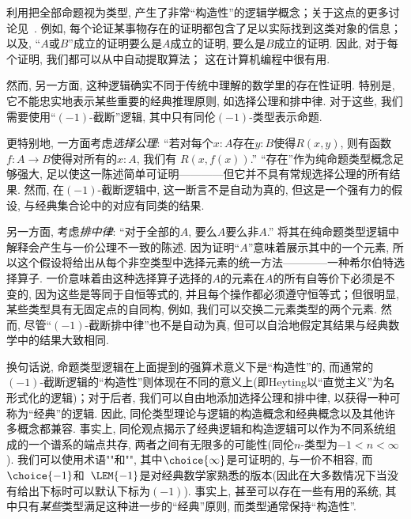 利用把全部命题视为类型, 产生了非常``构造性''的逻辑学概念；关于这点的更多讨论见~\cite{kolmogorov,TroelstraI,TroelstraII}.
例如, 每个论证某事物存在的证明都包含了足以实际找到这类对象的信息；以及, ``$A$或$B$''成立的证明要么是$A$成立的证明, 要么是$B$成立的证明. 
因此, 对于每个证明, 我们都可以从中自动提取算法； 这在计算机编程中很有用. 

然而, 另一方面, 这种逻辑确实不同于传统中理解的数学里的存在性证明. 
特别是, 它不能忠实地表示某些重要的经典推理原则, 如选择公理和排中律. 
对于这些, 我们需要使用``$(-1)$-截断''逻辑, 其中只有同伦$(-1)$-类型表示命题. 

%
更特别地, 一方面考虑\emph{选择公理}: ``若对每个$x: A$存在$y: B$使得$R(x,y)$, 则有函数$f : A\to B$使得对所有的$x:A$, 我们有 $R(x, f(x))$.''
``存在''作为纯命题类型概念足够强大, 足以使这一陈述简单可证明————但它并不具有常规选择公理的所有结果. 
然而, 在$(-1)$-截断逻辑中, 这一断言不是自动为真的, 但这是一个强有力的假设, 与经典集合论中的对应有同类的结果. 

%
%
另一方面, 考虑\emph{排中律}: ``对于全部的$A$, 要么$A$要么非$A$.''
将其在纯命题类型逻辑中解释会产生与一价公理不一致的陈述. 
因为证明``$A$''意味着展示其中的一个元素, 所以这个假设将给出从每个非空类型中选择元素的统一方法————一种希尔伯特选择算子. 
一价意味着由这种选择算子选择的$A$的元素在$A$的所有自等价下必须是不变的, 因为这些是等同于自恒等式的, 并且每个操作都必须遵守恒等式；但很明显, 某些类型具有无固定点的自同构, 例如, 我们可以交换二元素类型的两个元素. 
%
然而, 尽管``$(-1)$-截断排中律''也不是自动为真, 但可以自洽地假定其结果与经典数学中的结果大致相同. 

换句话说, 命题类型逻辑在上面提到的强算术意义下是``构造性''的, 而通常的$(-1)$-截断逻辑的``构造性''则体现在不同的意义上(即Heyting以``直觉主义''为名形式化的逻辑)；对于后者, 我们可以自由地添加选择公理和排中律, 以获得一种可称为``经典''的逻辑. 
因此, 同伦类型理论与逻辑的构造概念和经典概念以及其他许多概念都兼容.  
%
事实上, 同伦观点揭示了经典逻辑和构造逻辑可以作为不同系统组成的一个谱系的端点共存, 两者之间有无限多的可能性(同伦$n$-类型为$-1<n<\infty$). 
我们可以使用术语""和"", 其中$\choice{\infty}$是可证明的, \LEM{\infty}与一价不相容, 而$\choice{-1}$和~$\LEM{-1}$是对经典数学家熟悉的版本(因此在大多数情况下当没有给出下标时可以默认下标为$(-1)$). 事实上, 甚至可以存在一些有用的系统, 其中只有\emph{某些}类型满足这种进一步的``经典''原则, 而类型通常保持``构造性''. %

